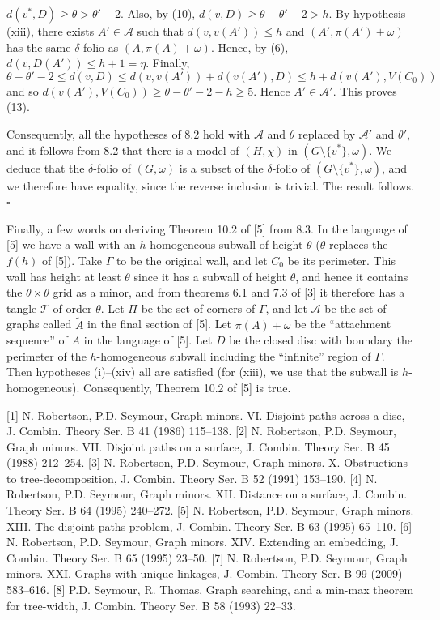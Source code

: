 \noindent $d(v^*, D) \ge \theta > \theta' + 2$. Also, by (10), $d(v, D) \ge \theta - \theta' - 2 > h$. By hypothesis (xiii), there exists $A' \in \mathcal{A}$ such that $d(v, v(A')) \le h$ and $(A', \pi(A') + \omega)$ has the same $\delta$-folio as $(A, \pi(A) + \omega)$. Hence, by (6), $d(v, D(A')) \le h + 1 = \eta$. Finally,
\begin{equation*}
\theta - \theta' - 2 \le d(v, D) \le d(v, v(A')) + d(v(A'), D) \le h + d(v(A'), V(C_0))
\end{equation*}
and so $d(v(A'), V(C_0)) \ge \theta - \theta' - 2 - h \ge 5$. Hence $A' \in \mathcal{A}'$. This proves (13).

Consequently, all the hypotheses of 8.2 hold with $\mathcal{A}$ and $\theta$ replaced by $\mathcal{A}'$ and $\theta'$, and it follows from 8.2 that there is a model of $(H, \chi)$ in $(G \setminus \{v^*\}, \omega)$. We deduce that the $\delta$-folio of $(G, \omega)$ is a subset of the $\delta$-folio of $(G \setminus \{v^*\}, \omega)$, and we therefore have equality, since the reverse inclusion is trivial. The result follows. $\square$

Finally, a few words on deriving Theorem 10.2 of [5] from 8.3. In the language of [5] we have a wall with an $h$-homogeneous subwall of height $\theta$ ($\theta$ replaces the $f(h)$ of [5]). Take $\Gamma$ to be the original wall, and let $C_0$ be its perimeter. This wall has height at least $\theta$ since it has a subwall of height $\theta$, and hence it contains the $\theta \times \theta$ grid as a minor, and from theorems 6.1 and 7.3 of [3] it therefore has a tangle $\mathcal{T}$ of order $\theta$. Let $\Pi$ be the set of corners of $\Gamma$, and let $\mathcal{A}$ be the set of graphs called $\tilde{A}$ in the final section of [5]. Let $\pi(A) + \omega$ be the ``attachment sequence'' of $A$ in the language of [5]. Let $D$ be the closed disc with boundary the perimeter of the $h$-homogeneous subwall including the ``infinite'' region of $\Gamma$. Then hypotheses (i)--(xiv) all are satisfied (for (xiii), we use that the subwall is $h$-homogeneous). Consequently, Theorem 10.2 of [5] is true.


[1] N. Robertson, P.D. Seymour, Graph minors. VI. Disjoint paths across a disc, J. Combin. Theory Ser. B 41 (1986) 115--138. [2] N. Robertson, P.D. Seymour, Graph minors. VII. Disjoint paths on a surface, J. Combin. Theory Ser. B 45 (1988) 212--254. [3] N. Robertson, P.D. Seymour, Graph minors. X. Obstructions to tree-decomposition, J. Combin. Theory Ser. B 52 (1991) 153--190. [4] N. Robertson, P.D. Seymour, Graph minors. XII. Distance on a surface, J. Combin. Theory Ser. B 64 (1995) 240--272. [5] N. Robertson, P.D. Seymour, Graph minors. XIII. The disjoint paths problem, J. Combin. Theory Ser. B 63 (1995) 65--110. [6] N. Robertson, P.D. Seymour, Graph minors. XIV. Extending an embedding, J. Combin. Theory Ser. B 65 (1995) 23--50. [7] N. Robertson, P.D. Seymour, Graph minors. XXI. Graphs with unique linkages, J. Combin. Theory Ser. B 99 (2009) 583--616. [8] P.D. Seymour, R. Thomas, Graph searching, and a min-max theorem for tree-width, J. Combin. Theory Ser. B 58 (1993) 22--33.
